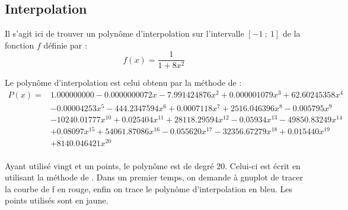 \subsection{Interpolation} 

Il s'agit ici de trouver un polynôme d'interpolation sur l'intervalle $[-1~;~1]$ de la fonction $f$ définie par :
\[
  f(x)=\frac{1}{1+8x^2}
\]
 
Le polynôme d'interpolation est celui obtenu par la méthode de  :
\begin{equation*}
\begin{split}
 P(x) = &1.000000000-0.0000000072x-7.991424876x^2+0.000001079x^3+62.60245358x^4\\
 & -0.00004253x^5-444.2347594x^6+0.0007118x^7+ 2516.046396x^8 -0.005795x^9\\ &-10240.01777x^{10} +0.025404x^{11}+28118.29594x^{12} -0.05934x^{13} -49850.83249x^{14} \\
& +0.08097x^{15}+54061.87086x^{16} -0.055620x^{17} -32356.67279x^{18} +0.015440x^{19}\\
&+8140.046421x^{20}\\
\end{split}
\end{equation*}

Ayant utilisé vingt et un points, le polynôme est de degré $20$. Celui-ci est écrit en utilisant la méthode de . Dans un premier temps, on demande à gnuplot de tracer la courbe de f en rouge,  enfin on trace le polynôme d'interpolation en bleu. Les points utilisés sont en jaune. 

